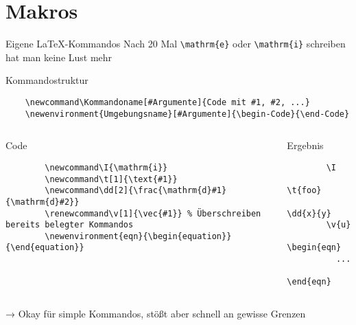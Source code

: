 \section{Makros}

\begin{frame}[fragile]{Eigene \LaTeX-Kommandos}
  Nach 20 Mal \verb+\mathrm{e}+ oder \verb+\mathrm{i}+ schreiben hat man keine Lust mehr
  \begin{block}{Kommandostruktur}
    \begin{lstlisting}
    \newcommand\Kommandoname[#Argumente]{Code mit #1, #2, ...}
    \newenvironment{Umgebungsname}[#Argumente]{\begin-Code}{\end-Code}
    \end{lstlisting}
  \end{block}
  \begin{columns}[onlytextwidth, t]
    \begin{column}{0.75\textwidth}
      \begin{block}{Code}
        \begin{lstlisting}
        \newcommand\I{\mathrm{i}}
        \newcommand\t[1]{\text{#1}}
        \newcommand\dd[2]{\frac{\mathrm{d}#1}{\mathrm{d}#2}}
        \renewcommand\v[1]{\vec{#1}} % Überschreiben bereits belegter Kommandos
        \newenvironment{eqn}{\begin{equation}}{\end{equation}}
        \end{lstlisting}
      \end{block}
    \end{column}
    \begin{column}{0.21\textwidth}
      \begin{block}{Ergebnis}
        \begin{lstlisting}
        \I
        \t{foo}
        \dd{x}{y}
        \v{u}
        \begin{eqn}
          ...
        \end{eqn}
        \end{lstlisting}
      \end{block}
    \end{column}
  \end{columns}
  \vspace{0.5cm}
  → Okay für simple Kommandos, stößt aber schnell an gewisse Grenzen
\end{frame}

